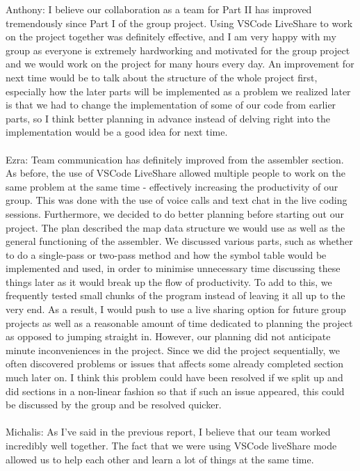 \documentclass[a4paper]{article}
\begin{document}
Anthony: I believe our collaboration as a team for Part II has improved tremendously since Part I of the group project. Using VSCode 
LiveShare to work on the project together was definitely effective, and I am very happy with my group as everyone is extremely 
hardworking and motivated for the group project and we would work on the project for many hours every day. An improvement for 
next time would be to talk about the structure of the whole project first, especially how the later parts will be implemented as 
a problem we realized later is that we had to change the implementation of some of our code from earlier parts, so I think better 
planning in advance instead of delving right into the implementation would be a good idea for next time. 
\\ \\
Ezra: Team communication has definitely improved from the assembler section. As before, the use of VSCode LiveShare allowed multiple
people to work on the same problem at the same time - effectively increasing the productivity of our group. This was done with the use
of voice calls and text chat in the live coding sessions. Furthermore, we decided to do better planning before starting out our project. 
The plan described the map data structure we would use as well as the general functioning of the assembler. We discussed various parts, such
as whether to do a single-pass or two-pass method and how the symbol table would be implemented and used, in order to minimise unnecessary time
discussing these things later as it would break up the flow of productivity. To add to this, we frequently tested small chunks of the program
instead of leaving it all up to the very end. As a result, I would push to use a live sharing option for future
group projects as well as a reasonable amount of time dedicated to planning the project as opposed to jumping straight in. However, our planning
did not anticipate minute inconveniences in the project. Since we did the project sequentially, we often discovered problems or issues that affects
some already completed section much later on. I think this problem could have been resolved if we split up and did sections in a non-linear fashion
so that if such an issue appeared, this could be discussed by the group and be resolved quicker.
\\ \\
Michalis: As I've said in the previous report, I believe that our team worked incredibly well together. The fact that 
we were using VSCode liveShare mode allowed us to help each other and learn a lot of things at the same time. 
\end{document}
